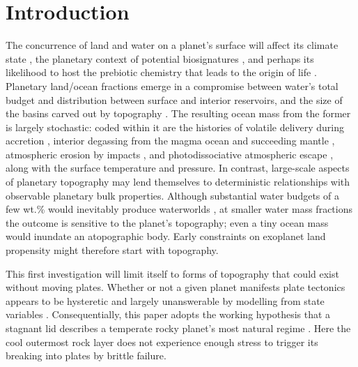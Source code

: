 \documentclass[trackchanges]{aastex63}
\begin{document}
\linenumbers
\section{Introduction}

The concurrence of land and water on a planet's surface will affect its climate state \citep{turbet_habitability_2016, rushby_effect_2019, del_genio_albedos_2019, graham_thermodynamic_2020, zhao_climate_2021}, the planetary context of potential biosignatures \citep{schwieterman_exoplanet_2018, glaser_detectability_2020, lisse_geologically_2020, krissansen-totton_oxygen_2021}, and perhaps its likelihood to host the prebiotic chemistry that leads to the origin of life \citep{patel_common_2015, rimmer_origin_2018, rosas_archaean_2021, van_kranendonk_elements_2021}. Planetary land/ocean fractions emerge in a compromise between water's total budget and distribution between surface and interior reservoirs, and the size of the basins carved out by topography \citep[e.g.,][]{simpson_bayesian_2017}. The resulting ocean mass from the former is largely stochastic: coded within it are the histories of volatile delivery during accretion \citep{raymond_high-resolution_2006, morbidelli_building_2012}, interior degassing from the magma ocean and succeeding mantle \citep{elkins-tanton_linked_2008, schaefer_redox_2017, barth_magma_2020, katyal_effect_2020, ortenzi_mantle_2020, GUIMOND2021106788, lichtenberg_vertically_2021, bower_retention_2021}, atmospheric erosion by impacts \citep{zahnle_cosmic_2017, schlichting_atmosphere_2018, howe_survival_2020}, and photodissociative atmospheric escape \citep{tian_water_2015, zahnle_strange_2019, gronoff_atmospheric_2020}, along with the surface temperature and pressure. In contrast, large-scale aspects of planetary topography may lend themselves to deterministic relationships with observable planetary bulk properties. Although substantial water budgets of a few wt.\% would inevitably produce waterworlds \citep[e.g.,][]{simpson_bayesian_2017}, at smaller water mass fractions the outcome is sensitive to the planet's topography; even a tiny ocean mass would inundate an atopographic body. Early constraints on exoplanet land propensity might therefore start with topography.



This first investigation will limit itself to forms of topography that could exist without moving plates. Whether or not a given planet manifests plate tectonics appears to be hysteretic and largely unanswerable by modelling from state variables \citep{lenardic_notion_2012, weller_evolution_2018, lenardic_diversity_2018}. Consequentially, this paper adopts the working hypothesis that a stagnant lid describes a temperate rocky planet's most natural regime \citep{stern_stagnant_2018}. Here the cool outermost rock layer does not experience enough stress to trigger its breaking into plates by brittle failure.
\end{document}
